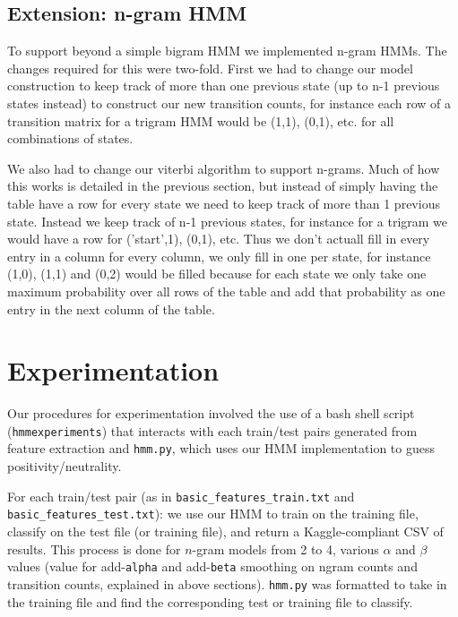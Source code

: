 \documentclass{article}
\begin{document}
\subsection{Extension: n-gram HMM}
To support beyond a simple bigram HMM we implemented n-gram HMMs. The changes required for this were two-fold. First we had to change our model construction to keep track of more than one previous state (up to n-1 previous states instead) to construct our new transition counts, for instance each row of a transition matrix for a trigram HMM would be (1,1), (0,1), etc. for all combinations of states. 

We also had to change our viterbi algorithm to support n-grams. Much of how this works is detailed in the previous section, but instead of simply having the table have a row for every state we need to keep track of more than 1 previous state. Instead we keep track of n-1 previous states, for instance for a trigram we would have a row for ('start',1), (0,1), etc. Thus we don't actuall fill in every entry in a column for every column, we only fill in one per state, for instance (1,0), (1,1) and (0,2) would be filled because for each state we only take one maximum probability over all rows of the table and add that probability as one entry in the next column of the table.

\section{Experimentation}

Our procedures for experimentation involved the use of a bash shell script (\texttt{hmmexperiments}) that interacts with each train/test pairs generated from feature extraction and \texttt{hmm.py}, which uses our HMM implementation to guess positivity/neutrality.\par

For each train/test pair (as in \texttt{basic\_features\_train.txt} and \texttt{basic\_features\_test.txt}): we use our HMM to train on the training file, classify on the test file (or training file), and return a Kaggle-compliant CSV of results. This process is done for $n$-gram models from 2 to 4, various $\alpha$ and $\beta$ values (value for add-\texttt{alpha} and add-\texttt{beta} smoothing on ngram counts and transition counts, explained in above sections). \texttt{hmm.py} was formatted to take in the training file and find the corresponding test or training file to classify.\par
\end{document}
